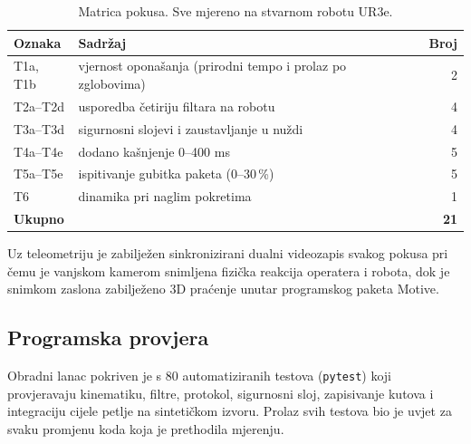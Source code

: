 \begin{table}[H]
  \caption{Matrica pokusa. Sve mjereno na stvarnom robotu UR3e.}
  \label{tab:matrica}
  \centering\small
  \begin{tabularx}{\columnwidth}{l X r}
    \hline
    \textbf{Oznaka} & \textbf{Sadržaj} & \textbf{Broj} \\
    \hline
    T1a, T1b   & vjernost oponašanja (prirodni tempo i prolaz po zglobovima) & 2 \\
    T2a--T2d   & usporedba četiriju filtara na robotu & 4 \\
    T3a--T3d   & sigurnosni slojevi i zaustavljanje u nuždi & 4 \\
    T4a--T4e   & dodano kašnjenje 0--400 ms & 5 \\
    T5a--T5e   & ispitivanje gubitka paketa (0--30\,\%) & 5 \\
    T6         & dinamika pri naglim pokretima & 1 \\
    \hline
    \multicolumn{2}{l}{\textbf{Ukupno}} & \textbf{21} \\
    \hline
  \end{tabularx}
\end{table}

Uz teleometriju je zabilježen sinkronizirani dualni videozapis svakog pokusa pri čemu je vanjskom kamerom snimljena fizička reakcija operatera i robota, dok je snimkom zaslona zabilježeno 3D praćenje unutar programskog paketa Motive.

\subsection{Programska provjera}

Obradni lanac pokriven je s 80 automatiziranih testova (\texttt{pytest}) koji
provjeravaju kinematiku, filtre, protokol, sigurnosni sloj, zapisivanje kutova i
integraciju cijele petlje na sintetičkom izvoru. Prolaz svih testova bio je
uvjet za svaku promjenu koda koja je prethodila mjerenju.

\FloatBarrier
